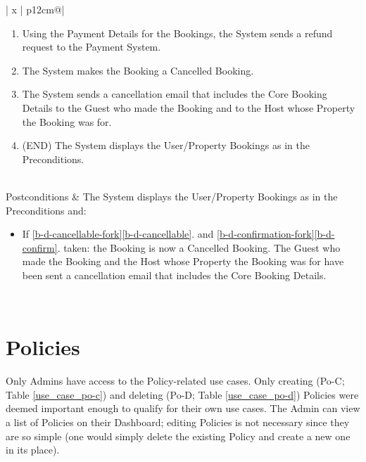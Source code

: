 \begin{table}[H]
\begin{tabular}{| x | p{12cm}@\qquad |}
\begin{enumerate}
                \begin{enumerate}
                    \item \label{b-d-confirm}If the User confirms the cancellation: go to \ref{b-d-confirmed}.
                    \item \label{b-d-cancel}If the User cancels the operation: go to \ref{b-d-end}.
                \end{enumerate}
                \item \label{b-d-confirmed} Using the Payment Details for the Bookings, the System sends a refund request to the Payment System.
                \item The System makes the Booking a Cancelled Booking.
                \item The System sends a cancellation email that includes the Core Booking Details to the Guest who made the Booking and to the Host whose Property the Booking was for.
                \item \label{b-d-end} (END) The System displays the User/Property Bookings as in the Preconditions.
          \end{enumerate}
          \\ \hline
          Postconditions &
          The System displays the User/Property Bookings as in the Preconditions and:
          \begin{itemize}
              \item If \ref{b-d-cancellable-fork}\ref{b-d-cancellable}. and \ref{b-d-confirmation-fork}\ref{b-d-confirm}. taken: the Booking is now a Cancelled Booking. The Guest who made the Booking and the Host whose Property the Booking was for have been sent a cancellation email that includes the Core Booking Details.
          \end{itemize}
           \\ \hline
      \end{tabular}
      \caption{Use Case B-D: Cancel Booking}
      \label{use_case_b-d}
  \end{table}

  \section{Policies}

  Only Admins have access to the Policy-related use cases. Only creating (Po-C; Table \ref{use_case_po-c}) and deleting (Po-D; Table \ref{use_case_po-d}) Policies were deemed important enough to qualify for their own use cases. The Admin can view a list of Policies on their Dashboard; editing Policies is not necessary since they are so simple (one would simply delete the existing Policy and create a new one in its place).

